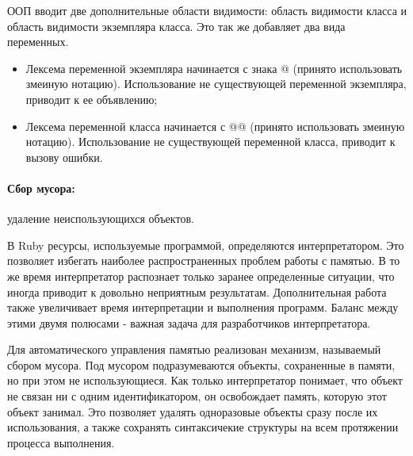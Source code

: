 ООП вводит две дополнительные области видимости: область видимости класса и область видимости экземпляра класса. Это так же добавляет два вида переменных.
\begin{itemize}
  \item Лексема переменной экземпляра начинается с знака @ (принято использовать змеиную нотацию). Использование не существующей переменной экземпляра, приводит к ее объявлению;
  
  \item Лексема переменной класса начинается с @@ (принято использовать змеиную нотацию). Использование не существующей переменной класса, приводит к вызову ошибки.
\end{itemize}

\paragraph*{Сбор мусора:} удаление неиспользующихся объектов.

В Ruby ресурсы, используемые программой, определяются интерпретатором. Это позволяет избегать наиболее распространенных проблем работы с памятью. В то же время интерпретатор распознает только заранее определенные ситуации, что иногда приводит к довольно неприятным результатам. Дополнительная работа также увеличивает время интерпретации и выполнения программ. Баланс между этими двумя полюсами - важная задача для разработчиков интерпретатора.

Для автоматического управления памятью реализован механизм, называемый сбором мусора. Под мусором подразумеваются объекты, сохраненные в памяти, но при этом не использующиеся. Как только интерпретатор понимает, что объект не связан ни с одним идентификатором, он освобождает память, которую этот объект занимал. Это позволяет удалять одноразовые объекты сразу после их использования, а также сохранять синтаксичекие структуры на всем протяжении процесса выполнения.